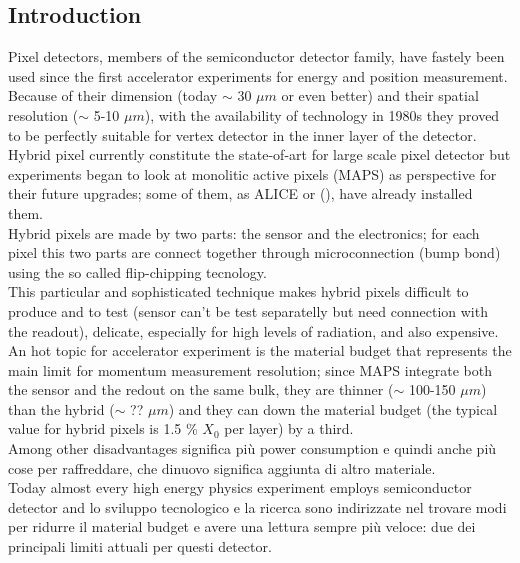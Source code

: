 \begin{titlepage}
\section{Introduction}
Pixel detectors, members of the semiconductor detector family, have fastely been used since the first 
accelerator experiments for energy and position measurement. 
Because of their dimension (today $\sim$ 30 $\mu m$ or even better) and their spatial resolution 
($\sim$ 5-10 $\mu m$), with the availability of technology in 1980s they proved to be perfectly suitable 
for vertex detector in the inner layer of the detector.\\
Hybrid pixel currently constitute the state-of-art for large scale pixel detector but experiments began 
to look at monolitic active pixels (MAPS) as perspective for their future upgrades; some of them, as ALICE or 
(), have already installed them. \\
Hybrid pixels are made by two parts: the sensor and the electronics; for each pixel this two parts are connect 
together through microconnection (bump bond) using the so called flip-chipping tecnology.\\
This particular and sophisticated technique makes hybrid pixels difficult to produce and to test (sensor can't be 
test separatelly but need connection with the readout), delicate, especially for high levels of radiation,
and also expensive. \\
An hot topic for accelerator experiment is the material budget that represents the main limit for momentum measurement
resolution; since MAPS integrate both the sensor and the redout on the same bulk, they are thinner 
($\sim$ 100-150 $\mu m$) than the hybrid ($\sim$ ?? $\mu m$) and they can down the material budget (the typical 
value for hybrid pixels is 1.5 \% $X_0$ per layer) by a third.\\

Among other disadvantages significa più power consumption e quindi anche più cose per raffreddare, che dinuovo
significa aggiunta di altro materiale.\\

Today almost every high energy physics experiment employs semiconductor detector and 
lo sviluppo tecnologico e la ricerca sono indirizzate nel trovare modi per ridurre il material budget e
avere una lettura sempre più veloce: due dei principali limiti attuali per questi detector. \\


\end{titlepage}
